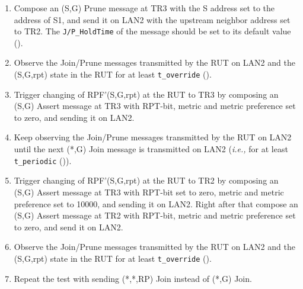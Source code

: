 \documentclass[11pt]{report}
\newcommand{\ie}{\emph{i.e.,}\xspace}
\begin{document}
\begin{enumerate}
  \item Compose an (S,G) Prune message at TR3 with the S address set to
  the address of S1, and send it on LAN2 with the upstream neighbor address
  set to TR2.
  The \verb=J/P_HoldTime= of the message should be set to its default
  value ({\PimsmJPHoldTime}).

  \item Observe the Join/Prune messages transmitted by the RUT on LAN2 and the
  (S,G,rpt) state in the RUT for at least \verb=t_override=
  ({\PimsmTOverride}).

  \item Trigger changing of RPF'(S,G,rpt) at the RUT to TR3 by composing an
  (S,G) Assert message at TR3 with RPT-bit, metric and metric 
  preference set to zero, and sending it on LAN2.

  \item Keep observing the Join/Prune messages transmitted by the
  RUT on LAN2 until the next (*,G) Join message is transmitted on
  LAN2 (\ie for at least \verb=t_periodic= ({\PimsmTPeriodic})).

  \item Trigger changing of RPF'(S,G,rpt) at the RUT to TR2 by composing an
  (S,G) Assert message at TR3 with RPT-bit set to zero, metric and metric 
  preference set to 10000, and sending it on LAN2. Right after that
  compose an (S,G) Assert message at TR2 with RPT-bit, metric and metric 
  preference set to zero, and send it on LAN2.

  \item Observe the Join/Prune messages transmitted by the RUT on LAN2 and the
  (S,G,rpt) state in the RUT for at least \verb=t_override=
  ({\PimsmTOverride}).

  \item Repeat the test with sending (*,*,RP) Join instead of (*,G)
  Join.

\end{enumerate}



\end{document}
